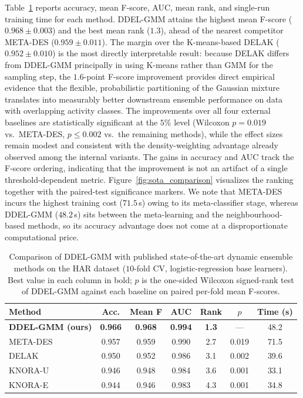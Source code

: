 \documentclass[lettersize,journal]{IEEEtran}
\newcommand{\tfourhighlight}[1]{{\color{tier4blue}#1}}
\begin{document}
	\tfourhighlight{\noindent Table~\ref{tab:sota_comparison} reports accuracy, mean F-score, AUC, mean rank, and single-run training time for each method. DDEL-GMM attains the highest mean F-score ($0.968 \pm 0.003$) and the best mean rank ($1.3$), ahead of the nearest competitor META-DES ($0.959 \pm 0.011$). The margin over the K-means-based DELAK ($0.952 \pm 0.010$) is the most directly interpretable result: because DELAK differs from DDEL-GMM principally in using K-means rather than GMM for the sampling step, the $1.6$-point F-score improvement provides direct empirical evidence that the flexible, probabilistic partitioning of the Gaussian mixture translates into measurably better downstream ensemble performance on data with overlapping activity classes. The improvements over all four external baselines are statistically significant at the $5\%$ level (Wilcoxon $p = 0.019$ vs.\ META-DES, $p \leq 0.002$ vs.\ the remaining methods), while the effect sizes remain modest and consistent with the density-weighting advantage already observed among the internal variants. The gains in accuracy and AUC track the F-score ordering, indicating that the improvement is not an artifact of a single threshold-dependent metric. Figure~\ref{fig:sota_comparison} visualizes the ranking together with the paired-test significance markers. We note that META-DES incurs the highest training cost ($71.5$\,s) owing to its meta-classifier stage, whereas DDEL-GMM ($48.2$\,s) sits between the meta-learning and the neighbourhood-based methods, so its accuracy advantage does not come at a disproportionate computational price.}
	
	\begin{table}[htbp]
		\begin{center}
			\caption{Comparison of DDEL-GMM with published state-of-the-art dynamic ensemble methods on the HAR dataset ($10$-fold CV, logistic-regression base learners). Best value in each column in bold; $p$ is the one-sided Wilcoxon signed-rank test of DDEL-GMM against each baseline on paired per-fold mean F-scores.}
			\label{tab:sota_comparison}
			\setlength{\tabcolsep}{3pt}
			\begin{tabular}{|l|c|c|c|c|c|c|}
				\hline
				\textbf{Method} & \textbf{Acc.} & \textbf{Mean F} & \textbf{AUC} & \textbf{Rank} & \textbf{$p$} & \textbf{Time (s)} \\
				\hline
				\textbf{DDEL-GMM (ours)} & \textbf{0.966} & \textbf{0.968} & \textbf{0.994} & \textbf{1.3} & --- & 48.2 \\
				\hline
				META-DES \cite{cruz_meta-oracle_2017} & 0.957 & 0.959 & 0.990 & 2.7 & 0.019 & 71.5 \\
				\hline
				DELAK \cite{guo_dynamic_2021} & 0.950 & 0.952 & 0.986 & 3.1 & 0.002 & 39.6 \\
				\hline
				KNORA-U \cite{ko_dynamic_2008} & 0.946 & 0.948 & 0.984 & 3.6 & 0.001 & 33.1 \\
				\hline
				KNORA-E \cite{ko_dynamic_2008} & 0.944 & 0.946 & 0.983 & 4.3 & 0.001 & 34.8 \\
				\hline
			\end{tabular}
		\end{center}
	\end{table}
	
\end{document}
